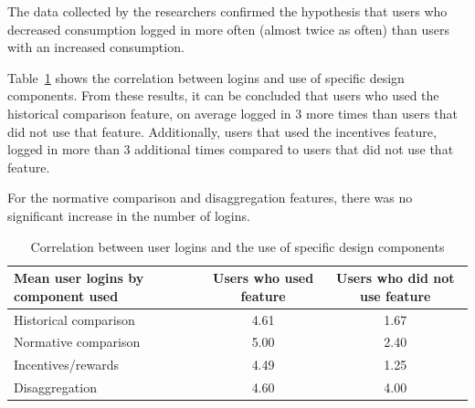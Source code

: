 \documentclass[journal]{vgtc}                %
\begin{document}
The data collected by the researchers confirmed the hypothesis that users who decreased consumption logged in more often (almost twice as often) than users with an increased consumption. 

% 

Table~\ref{hypo2} shows the correlation between logins and use of specific design components. From these results, it can be concluded that users who used the historical comparison feature, on average logged in 3 more times than users that did not use that feature. Additionally, users that used the incentives feature, logged in more than 3 additional times compared to users that did not use that feature.

For the normative comparison and disaggregation features, there was no significant increase in the number of logins. 

\begin{table}
  \caption{Correlation between user logins and the use of specific design components \cite{jain2012assessing}}
  \label{hypo2}
  \scriptsize
  \begin{center}
    \begin{tabular}{lcc}
    \multicolumn{1}{p{2.5cm}}{\centering Mean user logins by component used} &
       \multicolumn{1}{p{2.0cm}}{\centering Users who used feature} &
       \multicolumn{1}{p{2.0cm}}{\centering Users who did not use feature} \\
    \hline
      Historical comparison &  4.61 & 1.67 \\
      Normative comparison &  5.00 & 2.40 \\
      Incentives/rewards &  4.49 & 1.25 \\
      Disaggregation &  4.60 & 4.00 \\

    \end{tabular}
  \end{center}
\end{table}
\end{document}
